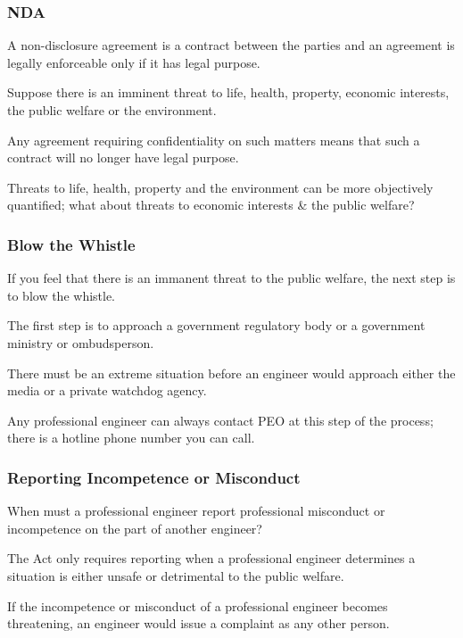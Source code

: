 \begin{frame}
\frametitle{NDA}

A non-disclosure agreement is a contract between the parties and an agreement is legally enforceable only if it has legal purpose.

Suppose there is an imminent threat to life, health, property, economic interests, the public welfare or the environment.

Any agreement requiring confidentiality on such matters means that such a contract will no longer have legal purpose.

Threats to life, health, property and the environment can be more objectively quantified; what about threats to economic interests \& the public welfare?


\end{frame}



\begin{frame}
\frametitle{Blow the Whistle}

If you feel that there is an immanent threat to the public welfare, the next step is to blow the whistle.

The first step is to approach a government regulatory body or a government ministry or ombudsperson.

There must be an extreme situation before an engineer would approach either the media or a private watchdog agency.

Any professional engineer can always contact PEO at this step of the process; there is a hotline phone number you can call.


\end{frame}



\begin{frame}
\frametitle{Reporting Incompetence or Misconduct}

When must a professional engineer report professional misconduct or incompetence on the part of another engineer?

The Act only requires reporting when a professional engineer determines a situation is either unsafe or detrimental to the public welfare.

If the incompetence or misconduct of a professional engineer becomes threatening, an engineer would issue a complaint as any other person.


\end{frame}



